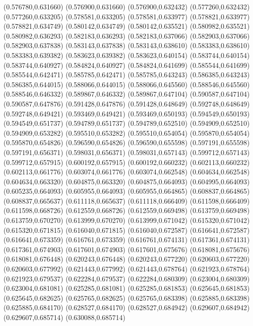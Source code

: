 (0.576780,0.631660)
(0.576900,0.631660)
(0.576900,0.632432)
(0.577260,0.632432)
(0.577260,0.633205)
(0.578581,0.633205)
(0.578581,0.633977)
(0.578821,0.633977)
(0.578821,0.634749)
(0.580142,0.634749)
(0.580142,0.635521)
(0.580982,0.635521)
(0.580982,0.636293)
(0.582183,0.636293)
(0.582183,0.637066)
(0.582903,0.637066)
(0.582903,0.637838)
(0.583143,0.637838)
(0.583143,0.638610)
(0.583383,0.638610)
(0.583383,0.639382)
(0.583623,0.639382)
(0.583623,0.640154)
(0.583744,0.640154)
(0.583744,0.640927)
(0.584824,0.640927)
(0.584824,0.641699)
(0.585544,0.641699)
(0.585544,0.642471)
(0.585785,0.642471)
(0.585785,0.643243)
(0.586385,0.643243)
(0.586385,0.644015)
(0.588066,0.644015)
(0.588066,0.645560)
(0.588546,0.645560)
(0.588546,0.646332)
(0.589867,0.646332)
(0.589867,0.647104)
(0.590587,0.647104)
(0.590587,0.647876)
(0.591428,0.647876)
(0.591428,0.648649)
(0.592748,0.648649)
(0.592748,0.649421)
(0.593469,0.649421)
(0.593469,0.650193)
(0.594549,0.650193)
(0.594549,0.651737)
(0.594789,0.651737)
(0.594789,0.652510)
(0.594909,0.652510)
(0.594909,0.653282)
(0.595510,0.653282)
(0.595510,0.654054)
(0.595870,0.654054)
(0.595870,0.654826)
(0.596590,0.654826)
(0.596590,0.655598)
(0.597191,0.655598)
(0.597191,0.656371)
(0.598031,0.656371)
(0.598031,0.657143)
(0.599712,0.657143)
(0.599712,0.657915)
(0.600192,0.657915)
(0.600192,0.660232)
(0.602113,0.660232)
(0.602113,0.661776)
(0.603074,0.661776)
(0.603074,0.662548)
(0.604634,0.662548)
(0.604634,0.663320)
(0.604875,0.663320)
(0.604875,0.664093)
(0.604995,0.664093)
(0.605235,0.664093)
(0.605955,0.664093)
(0.605955,0.664865)
(0.608837,0.664865)
(0.608837,0.665637)
(0.611118,0.665637)
(0.611118,0.666409)
(0.611598,0.666409)
(0.611598,0.668726)
(0.612559,0.668726)
(0.612559,0.669498)
(0.613759,0.669498)
(0.613759,0.670270)
(0.613999,0.670270)
(0.613999,0.671042)
(0.615320,0.671042)
(0.615320,0.671815)
(0.616040,0.671815)
(0.616040,0.672587)
(0.616641,0.672587)
(0.616641,0.673359)
(0.616761,0.673359)
(0.616761,0.674131)
(0.617361,0.674131)
(0.617361,0.674903)
(0.617601,0.674903)
(0.617601,0.675676)
(0.618081,0.675676)
(0.618081,0.676448)
(0.620243,0.676448)
(0.620243,0.677220)
(0.620603,0.677220)
(0.620603,0.677992)
(0.621443,0.677992)
(0.621443,0.678764)
(0.621923,0.678764)
(0.621923,0.679537)
(0.622284,0.679537)
(0.622284,0.680309)
(0.623004,0.680309)
(0.623004,0.681081)
(0.625285,0.681081)
(0.625285,0.681853)
(0.625645,0.681853)
(0.625645,0.682625)
(0.625765,0.682625)
(0.625765,0.683398)
(0.625885,0.683398)
(0.625885,0.684170)
(0.628527,0.684170)
(0.628527,0.684942)
(0.629607,0.684942)
(0.629607,0.685714)
(0.630088,0.685714)

